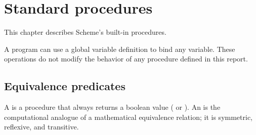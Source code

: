 
\chapter{Standard procedures}
\label{initialenv}
\label{builtinchapter}


This chapter describes Scheme's built-in procedures.


A program can use a global variable definition to bind any variable.
These operations do not modify the behavior of
any procedure defined in this report.

\section{Equivalence predicates}
\label{equivalencesection}

A  is a procedure that always returns a boolean
value (\schtrue{} or \schfalse).  An  is
the computational analogue of a mathematical equivalence relation; it is
symmetric, reflexive, and transitive.


